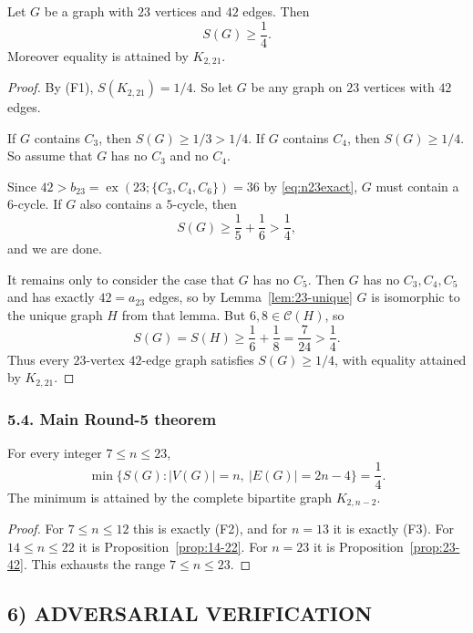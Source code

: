\begin{proposition}[The case $(n,m)=(23,42)$]\label{prop:23-42}
Let $G$ be a graph with $23$ vertices and $42$ edges. Then
\[
S(G)\ge \frac14.
\]
Moreover equality is attained by $K_{2,21}$.
\end{proposition}

\begin{proof}
By (F1), $S(K_{2,21})=1/4$.
So let $G$ be any graph on $23$ vertices with $42$ edges.

If $G$ contains $C_3$, then $S(G)\ge 1/3>1/4$.
If $G$ contains $C_4$, then $S(G)\ge 1/4$.
So assume that $G$ has no $C_3$ and no $C_4$.

Since $42>b_{23}=\operatorname{ex}(23;\{C_3,C_4,C_6\})=36$ by \eqref{eq:n23exact},
$G$ must contain a $6$-cycle.
If $G$ also contains a $5$-cycle, then
\[
S(G)\ge \frac15+\frac16>\frac14,
\]
and we are done.

It remains only to consider the case that $G$ has no $C_5$.
Then $G$ has no $C_3,C_4,C_5$ and has exactly $42=a_{23}$ edges, so by Lemma~\ref{lem:23-unique}
$G$ is isomorphic to the unique graph $H$ from that lemma.
But $6,8\in\mathcal C(H)$, so
\[
S(G)=S(H)\ge \frac16+\frac18=\frac{7}{24}>\frac14.
\]
Thus every $23$-vertex $42$-edge graph satisfies $S(G)\ge 1/4$, with equality attained by $K_{2,21}$.
\end{proof}

\subsubsection*{5.4. Main Round-5 theorem}

\begin{theorem}[The $K_{2,n-2}$ line through $n=23$]\label{thm:main-round5}
For every integer $7\le n\le 23$,
\[
\min\{S(G): |V(G)|=n,\ |E(G)|=2n-4\}=\frac14.
\]
The minimum is attained by the complete bipartite graph $K_{2,n-2}$.
\end{theorem}

\begin{proof}
For $7\le n\le 12$ this is exactly (F2), and for $n=13$ it is exactly (F3).
For $14\le n\le 22$ it is Proposition~\ref{prop:14-22}.
For $n=23$ it is Proposition~\ref{prop:23-42}.
This exhausts the range $7\le n\le 23$.
\end{proof}

\subsection*{6) ADVERSARIAL VERIFICATION}

